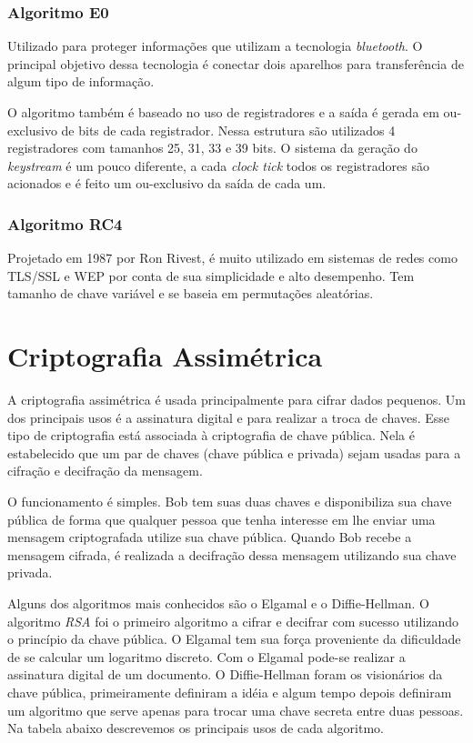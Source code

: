 \subsubsection{Algoritmo E0}
\label{algorithm-e0}

Utilizado para proteger informações que utilizam a tecnologia \textit{bluetooth}. O principal objetivo dessa tecnologia é conectar dois aparelhos para transferência de algum tipo de informação.

O algoritmo também é baseado no uso de registradores e a saída é gerada em ou-exclusivo de bits de cada registrador. Nessa estrutura são utilizados 4 registradores com tamanhos 25, 31, 33 e 39 bits. O sistema da geração do \textit{keystream} é um pouco diferente, a cada \textit{clock tick} todos os registradores são acionados e é feito um ou-exclusivo da saída de cada um.

\subsubsection{Algoritmo RC4}
\label{algorithm-rc4}

Projetado em 1987 por Ron Rivest, é muito utilizado em sistemas de redes como TLS/SSL e WEP por conta de sua simplicidade e alto desempenho. Tem tamanho de chave variável e se baseia em permutações aleatórias.

%
\section{Criptografia Assimétrica}
\label{assymmetric-cryptography}

%
A criptografia assimétrica é usada principalmente para cifrar dados pequenos. Um dos principais usos é a assinatura digital e para realizar a troca de chaves. Esse tipo de criptografia está associada à criptografia de chave pública. Nela é estabelecido que um par de chaves (chave pública e privada) sejam usadas para a cifração e decifração da mensagem. 

%
O funcionamento é simples. Bob tem suas duas chaves e disponibiliza sua chave pública de forma que qualquer pessoa que tenha interesse em lhe enviar uma mensagem criptografada utilize sua chave pública. Quando Bob recebe a mensagem cifrada, é realizada a decifração dessa mensagem utilizando sua chave privada.

%
Alguns dos algoritmos mais conhecidos são o Elgamal e o Diffie-Hellman. O algoritmo \textit{RSA} foi o primeiro algoritmo a cifrar e decifrar com sucesso utilizando o princípio da chave pública. O Elgamal tem sua força proveniente da dificuldade de se calcular um logaritmo discreto. Com o Elgamal pode-se realizar a assinatura digital de um documento. O Diffie-Hellman foram os visionários da chave pública, primeiramente definiram a idéia e algum tempo depois definiram um algoritmo que serve apenas para trocar uma chave secreta entre duas pessoas.  Na tabela abaixo descrevemos os principais usos de cada algoritmo. 



